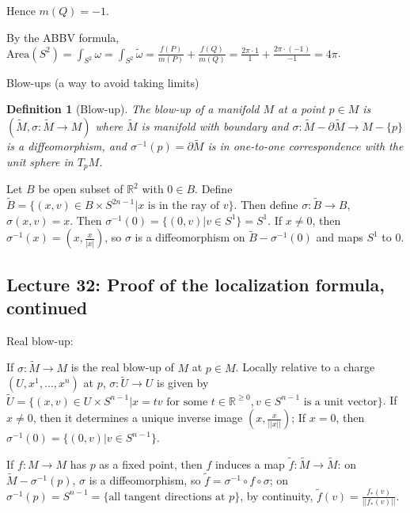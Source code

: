 \documentclass{article}
\theoremstyle{mystyle}
\newtheorem*{definition}{Definition}%
\theoremstyle{remark}
\numberwithin{equation}{section}
\begin{document}
Hence $m(Q)=-1$. 

By the ABBV formula, $\text{Area}(S^2) = \int_{S^2}\omega = \int_{S^2} \widetilde{\omega}
 = \frac{f(P)}{m(P)} + \frac{f(Q)}{m(Q)} =  \frac{2\pi\cdot 1}{1} + \frac{2\pi \cdot(-1)}{-1} = 4\pi$. 


Blow-ups (a way to avoid taking limits)

\begin{definition}[Blow-up] The \emph{blow-up} of a manifold $M$ at a point $p\in M$ is $(\widetilde{M},\sigma\colon \widetilde{M}\rightarrow M)$ where $\widetilde{M}$ is manifold with boundary and $\sigma \colon \widetilde{M}-\partial \widetilde{M} \rightarrow M-\{p\}$ is a diffeomorphism, and $\sigma^{-1}(p) = \partial \widetilde{M}$ is in one-to-one correspondence with the unit sphere in $T_pM$. 
\end{definition}

Let $B$ be open subset of $\mathbb{R}^2$ with $0\in B$. Define $\widetilde{B} = \{(x,v) \in B\times S^{2n-1}|x\text{ is in the ray of }v\}$. Then define $\sigma\colon \widetilde{B}\rightarrow B$, $\sigma(x,v) = x$.  Then $\sigma^{-1}(0) = \{(0,v)|v\in S^1\}=S^1$. If $x\neq 0$, then $\sigma^{-1}(x) = (x, \frac{x}{|x|})$, so $\sigma$ is a diffeomorphism on $\widetilde{B}-\sigma^{-1}(0)$ and maps $S^1$ to $0$. 










\subsection{Lecture 32: Proof of the localization formula, continued}

Real blow-up:

If $\sigma \colon \widetilde{M}\rightarrow M$ is the real blow-up of $M$ at $p\in M$. Locally relative to a charge $(U,x^1,...,x^n)$ at $p$, $\sigma\colon \widetilde{U}\rightarrow U$ is given by $\widetilde{U} = \{(x,v) \in U\times S^{n-1}| x = tv \text{ for some }t \in \mathbb{R}^{\geq 0},v\in S^{n-1}\text{ is a unit vector}\}$. If $x \neq 0$, then it determines a unique inverse image $(x,\frac{x}{||x||})$; If $x=0$, then $\sigma^{-1}(0) = \{(0,v)|v\in S^{n-1}\}$. 

If $f\colon M\rightarrow M$ has $p$ as a fixed point, then $f$ induces a map $\widetilde{f}\colon \widetilde{M}\rightarrow \widetilde{M}$: on $\widetilde{M} - \sigma^{-1}(p)$, $\sigma$ is a diffeomorphism, so $\widetilde{f} = \sigma^{-1}\circ f \circ \sigma$; on $\sigma^{-1}(p) = S^{n-1} = \{\text{all tangent directions at }p\}$, by continuity, $\widetilde{f}(v) = \frac{f_*(v)}{||f_*(v)||}$. 
\end{document}
